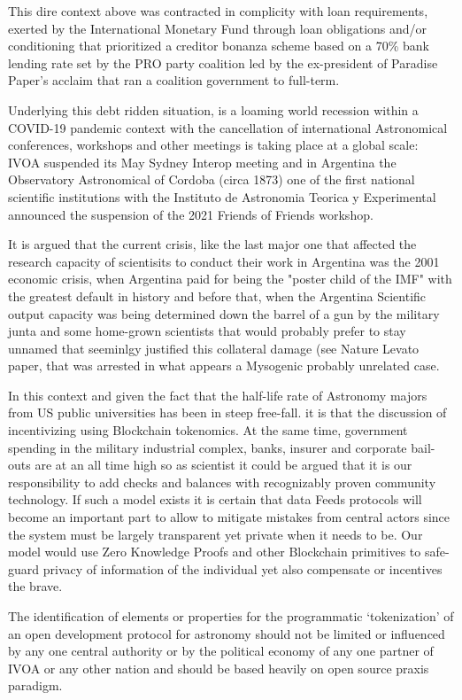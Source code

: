 \documentclass[final,5p,times,twocolumn,authoryear]{elsarticle}
\begin{document}
This dire context above was contracted in complicity with loan requirements, exerted by the International Monetary Fund through loan obligations and/or conditioning that prioritized a creditor bonanza scheme based on a 70\% bank lending rate set by the PRO party coalition led by the ex-president of Paradise Paper's acclaim that ran a coalition government to full-term. 

Underlying this debt ridden situation, is a loaming world recession within a COVID-19 pandemic context with the cancellation of international Astronomical conferences, workshops and other meetings is taking place at a global scale: IVOA suspended its May Sydney Interop meeting and in Argentina the Observatory Astronomical of Cordoba (circa 1873) one of the first national scientific institutions with the Instituto de Astronomia Teorica y Experimental announced the suspension of the 2021 Friends of Friends workshop. 

It is argued that the current crisis, like the last major one that affected the research capacity of scientisits to conduct their work in Argentina was the 2001 economic crisis, when Argentina paid for being the "poster child of the IMF" with the greatest default in history and before that, when the Argentina Scientific output capacity was being determined down the barrel of a gun by the military junta and some home-grown scientists that would probably prefer to stay unnamed that seeminlgy justified this collateral damage (see Nature Levato paper, that was arrested in what appears a Mysogenic probably unrelated case.

In this context and given the fact that the half-life rate of Astronomy majors from US public universities has been in steep free-fall.  \cite{milo_2018} it is that the discussion of incentivizing using Blockchain tokenomics. At the same time, government spending in the military industrial complex, banks, insurer and corporate bail-outs are at an all time high so as scientist it could be argued that it is our responsibility to add checks and balances with recognizably proven community technology. 
%
If such a model exists it is certain that data Feeds protocols will become an important part to allow to mitigate mistakes from central actors since the system must be largely transparent yet private when it needs to be. Our model would use Zero Knowledge Proofs and other Blockchain primitives to safe-guard privacy of information of the individual yet also compensate or incentives the brave. 
   
The identification of elements or properties for the programmatic `tokenization' of an open development protocol for astronomy should not be limited or influenced by any one central authority or by the political economy of any one partner of IVOA or any other nation and should be based heavily on open source praxis paradigm. 
   
\end{document}
